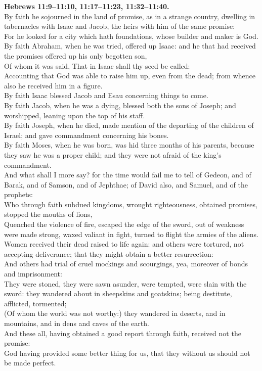 \documentclass[10pt]{article} %
\begin{document}
{\begin{minipage}[t]{0.49\textwidth}
\textbf{Hebrews 11:9--11:10, 11:17--11:23, 11:32--11:40.}\\
By faith he sojourned in the land of promise, as in a strange country, dwelling in tabernacles with Isaac and Jacob, the heirs with him of the same promise:\\
For he looked for a city which hath foundations, whose builder and maker is God.\\
By faith Abraham, when he was tried, offered up Isaac: and he that had received the promises offered up his only begotten son,\\
Of whom it was said, That in Isaac shall thy seed be called:\\
Accounting that God was able to raise him up, even from the dead; from whence also he received him in a figure.\\
By faith Isaac blessed Jacob and Esau concerning things to come.\\
By faith Jacob, when he was a dying, blessed both the sons of Joseph; and worshipped, leaning upon the top of his staff.\\
By faith Joseph, when he died, made mention of the departing of the children of Israel; and gave commandment concerning his bones.\\
By faith Moses, when he was born, was hid three months of his parents, because they saw he was a proper child; and they were not afraid of the king's commandment.\\
And what shall I more say? for the time would fail me to tell of Gedeon, and of Barak, and of Samson, and of Jephthae; of David also, and Samuel, and of the prophets:\\
Who through faith subdued kingdoms, wrought righteousness, obtained promises, stopped the mouths of lions,\\
Quenched the violence of fire, escaped the edge of the sword, out of weakness were made strong, waxed valiant in fight, turned to flight the armies of the aliens.\\
Women received their dead raised to life again: and others were tortured, not accepting deliverance; that they might obtain a better resurrection:\\
And others had trial of cruel mockings and scourgings, yea, moreover of bonds and imprisonment:\\
They were stoned, they were sawn asunder, were tempted, were slain with the sword: they wandered about in sheepskins and goatskins; being destitute, afflicted, tormented;\\
(Of whom the world was not worthy:) they wandered in deserts, and in mountains, and in dens and caves of the earth.\\
And these all, having obtained a good report through faith, received not the promise:\\
God having provided some better thing for us, that they without us should not be made perfect.
\end{minipage}}
\end{document}
